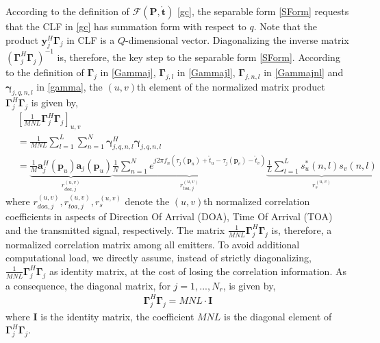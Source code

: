 \documentclass[review]{elsarticle}
\begin{document}
According to the definition of $\mathcal{F}(\boldsymbol{P},\mathring{\boldsymbol{t}})$ \eqref{gc}, the separable form \eqref{SForm} requests that the CLF in \eqref{gc} has summation form with respect to $q$. Note that the product $\boldsymbol{y}_j^H\boldsymbol{\Gamma}_{j}$ in CLF is a $Q$-dimensional vector. Diagonalizing the inverse matrix $(\boldsymbol{\Gamma}_{j}^H\boldsymbol{\Gamma}_{j})^{-1}$ is, therefore, the key step to the separable form \eqref{SForm}. According to the definition of $\boldsymbol{\Gamma}_{j}$ in \eqref{Gammaj},  $\boldsymbol{\Gamma}_{j,l}$ in \eqref{Gammajl}, $\boldsymbol{\Gamma}_{j,n,l}$ in \eqref{Gammajnl} and $\boldsymbol{\gamma}_{j,q,n,l}$ in \eqref{gamma}, the $(u,v)$th element of the normalized matrix product $\boldsymbol{\Gamma}_{j}^H\boldsymbol{\Gamma}_{j}$ is given by,
\begin{align}\label{off-diagonal}
    &[\frac{1}{MNL}\boldsymbol{\Gamma}_{j}^H\boldsymbol{\Gamma}_{j}]_{u,v}\\
    &=\frac{1}{MNL}\sum_{l=1}^L\sum_{n=1}^N \boldsymbol{\gamma}_{j,q,n,l}^H\boldsymbol{\gamma}_{j,q,n,l}\\
    &=\underbrace{\frac{1}{M}\boldsymbol{a}_j^H(\boldsymbol{p}_u)\boldsymbol{a}_j(\boldsymbol{p}_u)}_{r_{doa,j}^{(u,v)}}\underbrace{\frac{1}{N}\sum_{n=1}^N e^{j2\pi f_n(\tau_j(\boldsymbol{p}_u)+\mathring{t}_u-\tau_j(\boldsymbol{p}_v)-\mathring{t}_v)}}_{r_{toa,j}^{(u,v)}}\underbrace{\frac{1}{L}\sum_{l=1}^L s_u^\ast(n,l)s_v(n,l)}_{r_{s}^{(u,v)}}
\end{align}
where $r_{doa,j}^{(u,v)}, r_{toa,j}^{(u,v)}, r_{s}^{(u,v)}$ denote the $(u,v)$th normalized correlation coefficients in aspects of Direction Of Arrival (DOA), Time Of Arrival (TOA) and the transmitted signal, respectively. The matrix $\frac{1}{MNL}\boldsymbol{\Gamma}_{j}^H\boldsymbol{\Gamma}_{j}$ is, therefore, a normalized correlation matrix among all emitters. To avoid additional computational load, we directly assume, instead of strictly diagonalizing, $\frac{1}{MNL}\boldsymbol{\Gamma}_{j}^H\boldsymbol{\Gamma}_{j}$ as identity matrix, at the cost of losing the correlation information. As a consequence, the diagonal matrix, for $j=1,...,N_r$, is given by,
\begin{align}\label{GammaDiag}
    \boldsymbol{\Gamma}_{j}^H\boldsymbol{\Gamma}_{j}=MNL\cdot \boldsymbol{I}
\end{align}
where $\boldsymbol{I}$ is the identity matrix, the coefficient $MNL$ is the diagonal element of $\boldsymbol{\Gamma}_{j}^H\boldsymbol{\Gamma}_{j}$. 
\end{document}
